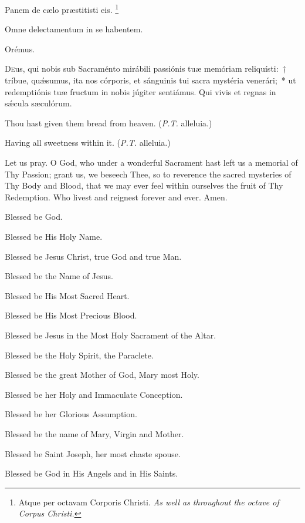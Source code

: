 \documentclass[11pt]{book}
\begin{document}
   \begin{paracol}{2}
\noindent \vv Panem de cælo præstitisti eis.
\tpalleluia{}\footnote{Atque per octavam Corporis Christi. \textit{As well as throughout the octave of Corpus Christi.}}

\noindent \rr Omne delectamentum in se habentem.
\tpalleluia{}


  Orémus.
  
  \lettrine{D}{e}us, qui nobis sub Sacraménto mirábili passiónis tuæ memóriam reliquísti:~† tríbue, quǽsumus, ita nos córporis, et sánguinis tui sacra mystéria venerári;~* ut redemptiónis tuæ fructum in nobis júgiter sentiámus. Qui vivis et regnas in sǽcula sæculórum. 

  \switchcolumn
\begin{otherlanguage}{english}
\noindent \vv Thou hast given them bread from heaven.
(\textit{P.T.} alleluia.)

\noindent \rr Having all sweetness within it.
(\textit{P.T.} alleluia.)

\noindent Let us pray. O God, who under a wonderful Sacrament hast left us a memorial of Thy Passion; grant us, we beseech Thee, so to reverence the sacred mysteries of Thy Body and Blood, that we may ever feel within ourselves the fruit of Thy Redemption. Who livest and reignest forever and ever. Amen.
\end{otherlanguage}\end{paracol}

\begin{multicols}{2}
\raggedcolumns
\begin{otherlanguage}{english}

Blessed be God. 

Blessed be His Holy Name. 

Blessed be Jesus Christ, true God and true Man.
 
Blessed be the Name of Jesus.

Blessed be His Most Sacred Heart.

Blessed be His Most Precious Blood.

Blessed be Jesus in the Most Holy Sacrament of the Altar.

Blessed be the Holy Spirit, the Paraclete.

Blessed be the great Mother of God, Mary most Holy.

Blessed be her Holy and Immaculate Conception.


Blessed be her Glorious Assumption.

Blessed be the name of Mary, Virgin and Mother.

Blessed be Saint Joseph, her most chaste spouse.

Blessed be God in His Angels and in His Saints.

\end{otherlanguage}
\end{multicols}
\end{document}
